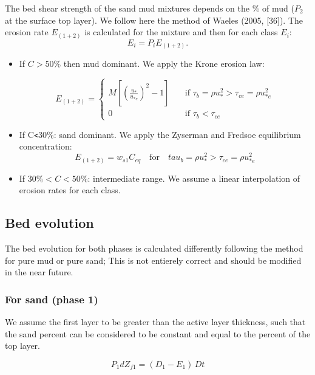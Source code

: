 The bed shear strength of the sand mud mixtures depends on the \% of mud ($P_2$ at the surface top layer). We follow here the method of Waeles (2005, [36]). The erosion rate $E_{(1+2)}$ is calculated for the mixture and then for each class $E_i$:
\begin{equation*}
E_i = P_i E_{(1+2)}.
\end{equation*}%
\begin{itemize}
\item If $C>50\%$ then mud dominant. We apply the Krone erosion law:

\begin{equation*}
E_{(1+2)} = \left\{\begin{array}{ll}
M\left[\left(\frac{u_*}{u_{*e}} \right)^2-1\right]\quad & \text{if}\,\,\tau_b=\rho u_*^2>\tau_{ce}=\rho u_{*e}^2\\  
0\quad & \text{if}\,\,\tau_b<\tau_{ce}
\end{array}
\right. 
\end{equation*}

\item If C\texttt{<}30\%: sand dominant. We apply the Zyserman and Fredsoe equilibrium concentration:
\begin{equation*}
E_{(1+2)} = w_{s1} C_{eq}\quad\text{for}\quad tau_b=\rho u_*^2>\tau_{ce}=\rho u_{*e}^2 
\end{equation*}

\item If $30\%<C<50\%$: intermediate range. We assume a linear interpolation of erosion rates for each class.
\end{itemize}

\subsection{Bed evolution}
The bed evolution for both phases is calculated differently following the
method for pure mud or pure sand; This is not entierely correct and should
be modified in the near future.

\subsubsection{For sand (phase 1)}
We assume the first layer to be greater than the active layer thickness,
such that the sand percent can be considered to be constant and equal to the
percent of the top layer.

\begin{equation*}
P_1 dZ_{f1} =(D_1 - E_1)\,Dt 
\end{equation*}

